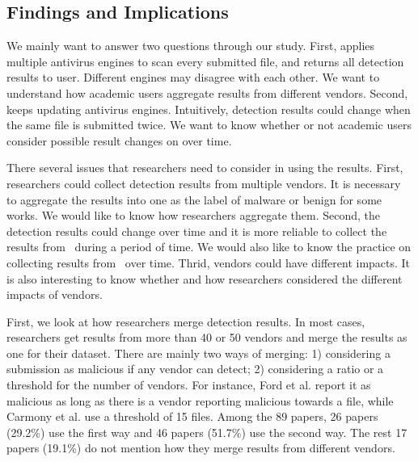 \subsection{Findings and Implications}
We mainly want to answer two questions through our study.
First, \vt{} applies multiple antivirus engines to scan every submitted file, 
and returns all detection results to user.
Different engines may disagree with each other.
We want to understand how academic users aggregate results from different vendors.
Second, \vt{} keeps updating antivirus engines. 
Intuitively, detection results could change when the same file is submitted twice.
We want to know whether or not academic users consider 
possible result changes on \vt{} over time.   







There several issues that researchers need to consider in using the results. 
First, researchers could collect detection results from multiple vendors. 
It is necessary to aggregate the results into one as the label of malware or benign for some works. 
We would like to know how researchers aggregate them. 
Second, the detection results could change over time and it is more reliable to collect the results from \vt\ during a period of time. 
We would also like to know the practice on collecting results from \vt\ over time. 
Thrid, vendors could have different impacts. 
It is also interesting to know whether and how researchers considered the different impacts of vendors.

First, we look at how researchers merge detection results. 
In most cases, researchers get results from more than 40 or 50 vendors and merge the results as one for their dataset. 
There are mainly two ways of merging: 1) considering a submission as malicious if any vendor can detect; 2) considering a ratio or a threshold for the number of vendors. 
For instance, Ford et al. \cite{ford2009analyzing} report it as malicious as long as there is a vendor reporting malicious
towards a file, while Carmony et al. use a threshold of 15 files. 
Among the 89 papers, 26 papers (29.2\%) use the first way and 46 papers  (51.7\%) use the second way. 
The rest 17 papers (19.1\%) do not mention how they merge results from different vendors.

